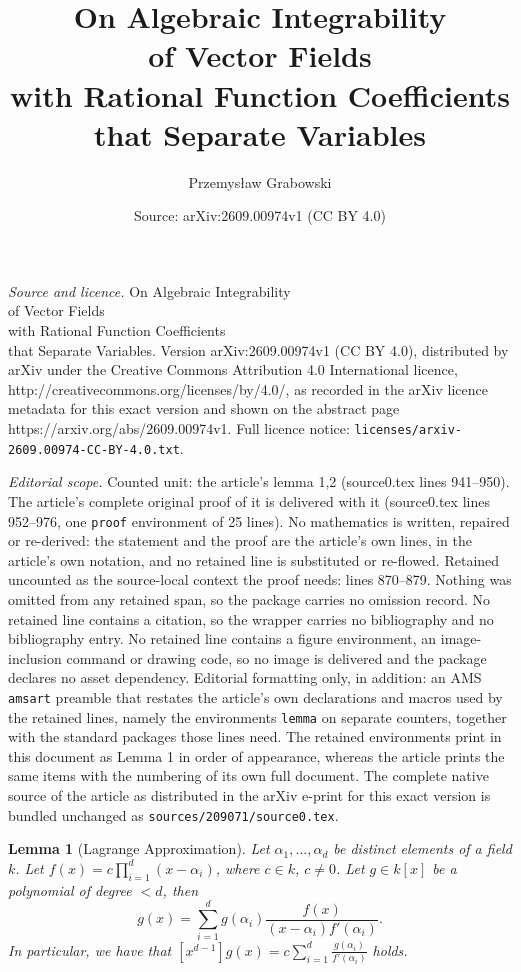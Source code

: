 \documentclass[10pt,a4paper]{amsart}
\title{On Algebraic Integrability\\ of Vector Fields \\ with Rational Function Coefficients\\ that Separate Variables}
\author{Przemys{\l}aw Grabowski}
\date{Source: arXiv:2609.00974v1 (CC BY 4.0)}
\newtheorem{lemma}{Lemma}
\begin{document}
\maketitle

\noindent\emph{Source and licence.} On Algebraic Integrability\\ of Vector Fields \\ with Rational Function Coefficients\\ that Separate Variables. Version arXiv:2609.00974v1 (CC BY 4.0), distributed by arXiv under the Creative Commons Attribution 4.0 International licence, http://creativecommons.org/licenses/by/4.0/, as recorded in the arXiv licence metadata for this exact version and shown on the abstract page https://arxiv.org/abs/2609.00974v1. Full licence notice: \texttt{licenses/arxiv-2609.00974-CC-BY-4.0.txt}.\par\smallskip

\noindent\textit{Editorial scope.} Counted unit: the article's lemma 1,2 (source0.tex lines 941--950). The article's complete original proof of it is delivered with it (source0.tex lines 952--976, one \texttt{proof} environment of 25 lines). No mathematics is written, repaired or re-derived: the statement and the proof are the article's own lines, in the article's own notation, and no retained line is substituted or re-flowed.  Retained uncounted as the source-local context the proof needs: lines 870--879.  Nothing was omitted from any retained span, so the package carries no omission record.  No retained line contains a citation, so the wrapper carries no bibliography and no bibliography entry.  No retained line contains a figure environment, an image-inclusion command or drawing code, so no image is delivered and the package declares no asset dependency.  Editorial formatting only, in addition: an AMS \texttt{amsart} preamble that restates the article's own declarations and macros used by the retained lines, namely the environments \texttt{lemma} on separate counters, together with the standard packages those lines need.  The retained environments print in this document as Lemma 1 in order of appearance, whereas the article prints the same items with the numbering of its own full document.  The complete native source of the article as distributed in the arXiv e-print for this exact version is bundled unchanged as \texttt{sources/209071/source0.tex}.
\begin{lemma}[Lagrange Approximation]\label{lem: Lagrange Approximation}
    Let $\alpha_1,\ldots,\alpha_d$ be distinct elements of a field $k$. Let $f(x)=c\prod_{i=1}^d(x-\alpha_i)$, where $c\in k$, $c\ne 0$. Let $g\in k[x]$ be a polynomial of degree $<d$, then
    \[
    g(x)=\sum_{i=1}^d g(\alpha_i)\frac{f(x)}{(x-\alpha_i)f'(\alpha_i)}.
    \]
    In particular, we have that 
    $
    [x^{d-1}]g(x)=c\sum_{i=1}^d \frac{g(\alpha_i)}{f'(\alpha_i)}
    $ holds. 
\end{lemma}
\end{document}
